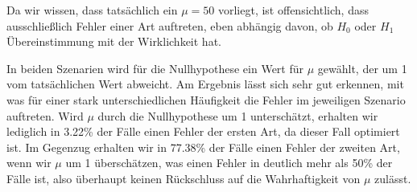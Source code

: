 \documentclass[a4paper]{scrartcl}
\def \blattnr {9}
\begin{document}
\begin{enumerate}[label=\bfseries \blattnr.\arabic*]
      Da wir wissen, dass tatsächlich ein $\mu=50$ vorliegt, ist offensichtlich, 
      dass ausschließlich Fehler einer Art auftreten, eben abhängig davon, ob $H_0$ 
      oder $H_1$ Übereinstimmung mit der Wirklichkeit hat.
      
      In beiden Szenarien wird für die Nullhypothese ein Wert für $\mu$ gewählt, der 
      um 1 vom tatsächlichen Wert abweicht. Am Ergebnis lässt sich sehr gut erkennen,
      mit was für einer stark unterschiedlichen Häufigkeit die Fehler im jeweiligen 
      Szenario auftreten. Wird $\mu$ durch die Nullhypothese um 1 unterschätzt, 
      erhalten wir lediglich in 3.22\% der Fälle einen Fehler der ersten Art, 
      da dieser Fall optimiert ist. Im Gegenzug erhalten wir in 77.38\% der Fälle 
      einen Fehler der zweiten Art, wenn wir $\mu$ um 1 überschätzen, was einen 
      Fehler in deutlich mehr als 50\% der Fälle ist, also überhaupt keinen Rückschluss auf 
      die Wahrhaftigkeit von $\mu$ zulässt.

\end{enumerate}
\end{document}
